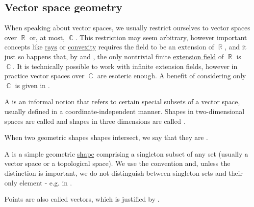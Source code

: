 \subsection{Vector space geometry}\label{subsec:vector_space_geometry}

\begin{remark}\label{rem:real_field_extensions}
  When speaking about vector spaces, we usually restrict ourselves to vector spaces over \( \BbbR \) or, at most, \( \BbbC \). This restriction may seem arbitrary, however important concepts like \hyperref[def:geometric_ray]{rays} or \hyperref[def:convex_set]{convexity} requires the field to be an extension of \( \BbbR \), and it just so happens that, by  and , the only nontrivial finite \hyperref[def:field_extension]{extension field} of \( \BbbR \) is \( \BbbC \). It is technically possible to work with infinite extension fields, however in practice vector spaces over \( \BbbC \) are esoteric enough. A benefit of considering only \( \BbbC \) is given in .
\end{remark}

\begin{definition}\label{def:geometric_shape}
  A  is an informal notion that refers to certain special subsets of a vector space, usually defined in a coordinate-independent manner. Shapes in two-dimensional spaces are called  and shapes in three dimensions are called .

  When two geometric shapes shapes intersect, we say that they are .
\end{definition}

\begin{definition}\label{def:point}
  A  is a simple geometric \hyperref[def:geometric_shape]{shape} comprising a singleton subset of any set (usually a vector space or a topological space). We use the convention  and, unless the distinction is important, we do not distinguish between singleton sets and their only element - e.g. in .

  Points are also called vectors, which is justified by .
\end{definition}

